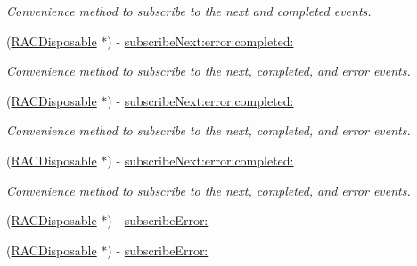 \begin{DoxyCompactItemize}
\begin{DoxyCompactList}\small\item\em Convenience method to subscribe to the {\ttfamily next} and {\ttfamily completed} events. \end{DoxyCompactList}\item 
\mbox{\label{interface_r_a_c_signal_a50b7b51715316c5da372cc0cf96039f6}} 
(\mbox{\hyperlink{interface_r_a_c_disposable}{R\+A\+C\+Disposable}} $\ast$) -\/ \mbox{\hyperlink{interface_r_a_c_signal_a50b7b51715316c5da372cc0cf96039f6}{subscribe\+Next\+:error\+:completed\+:}}
\begin{DoxyCompactList}\small\item\em Convenience method to subscribe to the {\ttfamily next}, {\ttfamily completed}, and {\ttfamily error} events. \end{DoxyCompactList}\item 
\mbox{\label{interface_r_a_c_signal_a50b7b51715316c5da372cc0cf96039f6}} 
(\mbox{\hyperlink{interface_r_a_c_disposable}{R\+A\+C\+Disposable}} $\ast$) -\/ \mbox{\hyperlink{interface_r_a_c_signal_a50b7b51715316c5da372cc0cf96039f6}{subscribe\+Next\+:error\+:completed\+:}}
\begin{DoxyCompactList}\small\item\em Convenience method to subscribe to the {\ttfamily next}, {\ttfamily completed}, and {\ttfamily error} events. \end{DoxyCompactList}\item 
\mbox{\label{interface_r_a_c_signal_a50b7b51715316c5da372cc0cf96039f6}} 
(\mbox{\hyperlink{interface_r_a_c_disposable}{R\+A\+C\+Disposable}} $\ast$) -\/ \mbox{\hyperlink{interface_r_a_c_signal_a50b7b51715316c5da372cc0cf96039f6}{subscribe\+Next\+:error\+:completed\+:}}
\begin{DoxyCompactList}\small\item\em Convenience method to subscribe to the {\ttfamily next}, {\ttfamily completed}, and {\ttfamily error} events. \end{DoxyCompactList}\item 
(\mbox{\hyperlink{interface_r_a_c_disposable}{R\+A\+C\+Disposable}} $\ast$) -\/ \mbox{\hyperlink{interface_r_a_c_signal_a6e792da9c8499ad5791e14bd126e99cb}{subscribe\+Error\+:}}
\item 
(\mbox{\hyperlink{interface_r_a_c_disposable}{R\+A\+C\+Disposable}} $\ast$) -\/ \mbox{\hyperlink{interface_r_a_c_signal_a6e792da9c8499ad5791e14bd126e99cb}{subscribe\+Error\+:}}

\end{DoxyCompactItemize}
